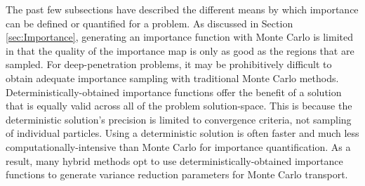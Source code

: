 The past few subsections have described the different means by which importance
can be defined or quantified for a problem.
As discussed in Section \ref{sec:Importance}, generating an importance function
with Monte Carlo is limited in that the quality of the importance map is only as
good as the regions that are sampled. For deep-penetration problems, it may be
prohibitively difficult to obtain adequate importance sampling with traditional
Monte Carlo methods. Deterministically-obtained importance functions
offer the benefit of a solution that is equally valid across all of the problem
solution-space. This is because the deterministic solution's precision is
limited to convergence criteria, not sampling of individual particles. Using a
deterministic solution is often faster and much less computationally-intensive
than Monte Carlo for importance quantification.
As a result, many hybrid methods opt
to use deterministically-obtained importance functions to generate variance
reduction parameters for Monte Carlo transport.
